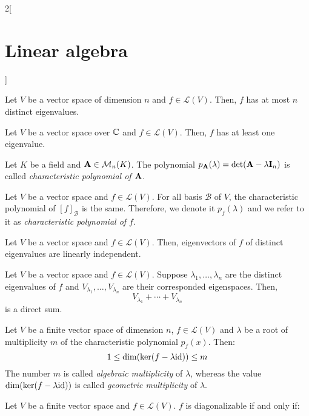 \documentclass[../../../main.tex]{subfiles}
\begin{document}
\begin{multicols}{2}[\section{Linear algebra}]
\begin{lemma}
  \end{lemma}
  \begin{corollary}
    Let $V$ be a vector space of dimension $n$ and $f\in\mathcal{L}(V)$. Then, $f$ has at most $n$ distinct eigenvalues.
  \end{corollary}
  \begin{corollary}
    Let $V$ be a vector space over $\mathbb{C}$ and $f\in\mathcal{L}(V)$. Then, $f$ has at least one eigenvalue.
  \end{corollary}
  \begin{definition}
    Let $K$ be a field and $\boldsymbol{\mathrm{A}}\in\mathcal{M}_n(K)$. The polynomial $p_{\boldsymbol{\mathrm{A}}}(\lambda)=\det(\boldsymbol{\mathrm{A}}-\lambda \boldsymbol{\mathrm{I}}_n)$ is called \textit{characteristic polynomial of $\boldsymbol{\mathrm{A}}$}.
  \end{definition}
  \begin{prop}
    Let $V$ be a vector space and $f\in\mathcal{L}(V)$. For all basis $\mathcal{B}$ of $V$, the characteristic polynomial of $[f]_\mathcal{B}$ is the same. Therefore, we denote it $p_f(\lambda)$ and we refer to it as \textit{characteristic polynomial of $f$}.
  \end{prop}
  \begin{prop}
    Let $V$ be a vector space and $f\in\mathcal{L}(V)$. Then, eigenvectors of $f$ of distinct eigenvalues are linearly independent.
  \end{prop}
  \begin{corollary}
    Let $V$ be a vector space and $f\in\mathcal{L}(V)$. Suppose $\lambda_1,\ldots,\lambda_n$ are the distinct eigenvalues of $f$ and $V_{\lambda_1},\ldots,V_{\lambda_n}$ are their corresponded eigenspaces. Then, $$V_{\lambda_1}+\cdots+V_{\lambda_n}$$ is a direct sum.
  \end{corollary}
  \begin{prop}
    Let $V$ be a finite vector space of dimension $n$, $f\in\mathcal{L}(V)$ and $\lambda$ be a root of multiplicity $m$ of the characteristic polynomial $p_f(x)$. Then: $$1\leq \dim(\ker(f-\lambda\mathrm{id}))\leq m$$
    The number $m$ is called \textit{algebraic multiplicity} of $\lambda$, whereas the value $\dim(\ker(f-\lambda\mathrm{id}))$ is called \textit{geometric multiplicity} of $\lambda$.
  \end{prop}
  \begin{theorem}
    Let $V$ be a finite vector space and $f\in\mathcal{L}(V)$. $f$ is diagonalizable if and only if:
    \begin{enumerate}

\end{enumerate}
\end{theorem}
\end{multicols}
\end{document}
